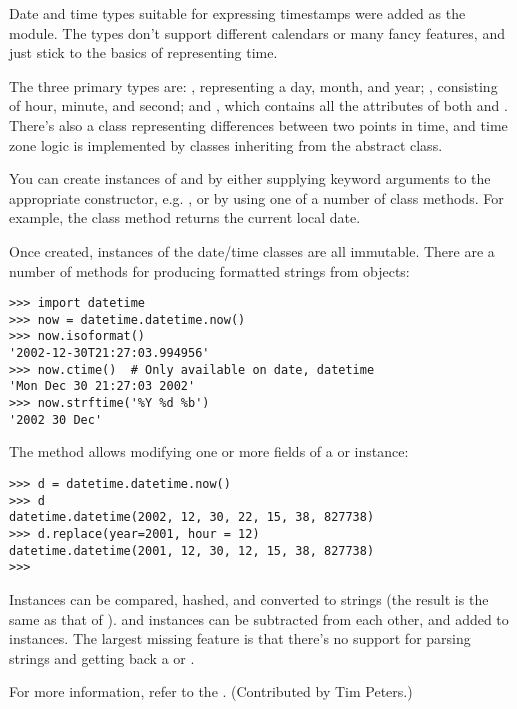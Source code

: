 \documentclass{howto}
\begin{document}
Date and time types suitable for expressing timestamps were added as
the  module.  The types don't support different
calendars or many fancy features, and just stick to the basics of
representing time.

The three primary types are: , representing a day, month,
and year; , consisting of hour, minute, and second; and
, which contains all the attributes of both
 and .  There's also a
 class representing differences between two points
in time, and time zone logic is implemented by classes inheriting from
the abstract  class.

You can create instances of  and  by either
supplying keyword arguments to the appropriate constructor,
e.g. , or by using
one of a number of class methods.  For example, the 
class method returns the current local date.

Once created, instances of the date/time classes are all immutable.
There are a number of methods for producing formatted strings from
objects:

\begin{verbatim}
>>> import datetime
>>> now = datetime.datetime.now()
>>> now.isoformat()
'2002-12-30T21:27:03.994956'
>>> now.ctime()  # Only available on date, datetime
'Mon Dec 30 21:27:03 2002'
>>> now.strftime('%Y %d %b')
'2002 30 Dec'
\end{verbatim}

The  method allows modifying one or more fields 
of a  or  instance:

\begin{verbatim}
>>> d = datetime.datetime.now()
>>> d
datetime.datetime(2002, 12, 30, 22, 15, 38, 827738)
>>> d.replace(year=2001, hour = 12)
datetime.datetime(2001, 12, 30, 12, 15, 38, 827738)
>>>
\end{verbatim}

Instances can be compared, hashed, and converted to strings (the
result is the same as that of ).   and
 instances can be subtracted from each other, and
added to  instances.  The largest missing feature is
that there's no support for parsing strings and getting back a
 or .

For more information, refer to the .
(Contributed by Tim Peters.)
\end{document}
